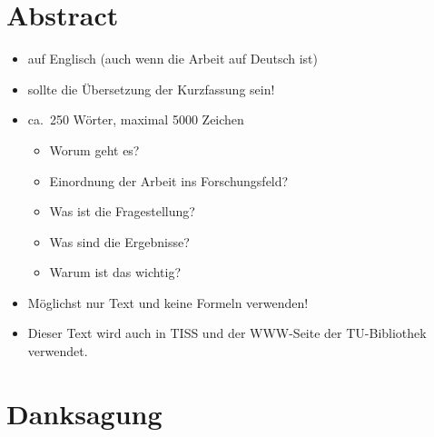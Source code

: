 
\chapter*{Abstract}
\thispagestyle{empty}

\begin{itemize}
  \item auf Englisch (auch wenn die Arbeit auf Deutsch ist)
  \item sollte die Übersetzung der Kurzfassung sein!
  \item ca.\ 250 Wörter, maximal 5000 Zeichen
    \begin{itemize}
      \item Worum geht es?
      \item Einordnung der Arbeit ins Forschungsfeld?
      \item Was ist die Fragestellung?
      \item Was sind die Ergebnisse?
      \item Warum ist das wichtig?
    \end{itemize}
  \item Möglichst nur Text und keine Formeln verwenden!
  \item Dieser Text wird auch in TISS und der WWW-Seite der TU-Bibliothek verwendet.
\end{itemize}

\cleardoublepage


\chapter*{Danksagung} %
\thispagestyle{empty}

